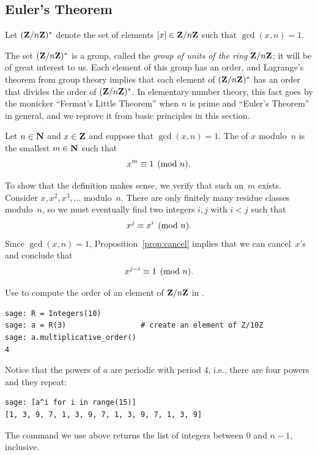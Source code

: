 \subsection{Euler's Theorem}
%
\label{sec:flittle}%
%
Let $(\mathbf{Z}/n\mathbf{Z}{})^*$ denote the set of elements $[x] \in \mathbf{Z}/n\mathbf{Z}{}$
such that $\gcd(x,n)=1$.

The set $(\mathbf{Z}/n\mathbf{Z}{})^*$ is a group, called the {\em group of units of
  the ring $\mathbf{Z}/n\mathbf{Z}{}$}; it will be of great interest to us.  Each
element of this group has an order, and Lagrange's theorem from group
theory implies that each element of $(\mathbf{Z}/n\mathbf{Z}{})^*$ has an order that
divides the order of $(\mathbf{Z}/n\mathbf{Z}{})^*$.  In elementary number theory, this
fact goes by the monicker ``Fermat's Little Theorem'' when $n$ is
prime and ``Euler's Theorem'' in general, and we reprove it from basic
principles in this section.

\begin{definition}%
\label{defn:order}
Let $n\in\mathbf{N}$ and $x\in\mathbf{Z}$ and suppose that $\gcd(x,n)=1$.
The  of $x$ modulo~$n$ is the smallest $m\in\mathbf{N}$
such that
$$
  x^m \equiv 1\pmod{n}.
$$
\end{definition}
To show that the definition makes sense, we verify
that such an~$m$ exists.  Consider $x, x^2, x^3, \ldots$ modulo~$n$.
There are only finitely many residue classes modulo~$n$, so we must
eventually find two integers $i, j$ with $i<j$ such that
$$
  x^j\equiv x^i\pmod{n}.
$$
Since $\gcd(x,n)=1$, Proposition~\ref{prop:cancel} implies that
we can cancel~$x$'s and conclude that
$$
  x^{j-i}\equiv 1\pmod{n}.
$$

\begin{sg}
Use  to compute the
order of an element of $\mathbf{Z}/n\mathbf{Z}$ in \sage.
\begin{verbatim}
sage: R = Integers(10)
sage: a = R(3)                 # create an element of Z/10Z
sage: a.multiplicative_order()
4
\end{verbatim}%
Notice that the powers of $a$ are periodic with period $4$, i.e.,
there are four powers and they repeat:
\begin{verbatim}
sage: [a^i for i in range(15)]
[1, 3, 9, 7, 1, 3, 9, 7, 1, 3, 9, 7, 1, 3, 9]
\end{verbatim}
The command  we use
above returns the list of integers between $0$ and $n-1$,
inclusive.
\end{sg}


